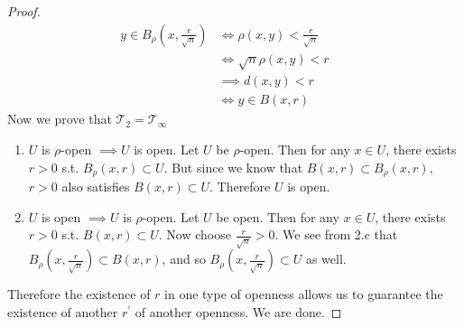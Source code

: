 \begin{proof}
        \begin{align}
          y \in B_\rho (x, \frac{r}{\sqrt{n}}) & \iff \rho(x, y) < \frac{r}{\sqrt{n}}\\ 
                                               & \iff \sqrt{n} \rho(x, y) < r && \tag{$n > 0$}\\
                                               & \implies d(x, y) < r && \tag{transitivity from 2.b}\\
                                               & \iff y \in B(x, r)
        \end{align}
        Now we prove that $\mathscr{T}_2 = \mathscr{T}_\infty$
        \begin{enumerate}
          \item $U$ is $\rho$-open $\implies U$ is open. Let $U$ be $\rho$-open. Then for any $x \in U$, there exists $r > 0$ s.t. $B_\rho (x, r) \subset U$. But since we know that $B(x, r) \subset B_\rho (x, r)$, $r > 0$ also satisfies $B(x, r) \subset U$. Therefore $U$ is open. 

          \item $U$ is open $\implies U$ is $\rho$-open. Let $U$ be open. Then for any $x \in U$, there exists $r > 0$ s.t. $B(x, r) \subset U$. Now choose $\frac{r}{\sqrt{n}} > 0$. We see from 2.c that $B_\rho (x, \frac{r}{\sqrt{n}}) \subset B(x, r)$, and so $B_\rho (x, \frac{r}{\sqrt{n}}) \subset U$ as well.  
        \end{enumerate}
        Therefore the existence of $r$ in one type of openness allows us to guarantee the existence of another $r^\prime$ of another openness. We are done. 
      \end{proof}

